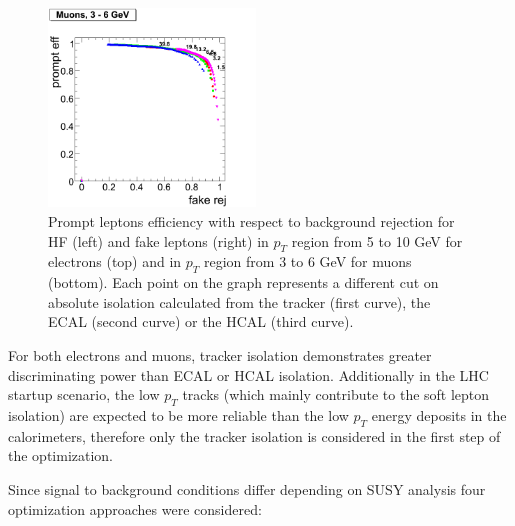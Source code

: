 \documentclass{cmspaper}
\begin{document}
\begin{figure}[htbp]
\begin{center}
   \includegraphics[width = 0.49\textwidth]{pictures/bkgdRej_sigEff/muon_fake_ptCut0_ptCut1.png}
   \caption{\small{Prompt leptons efficiency  with respect to background rejection for HF (left) and  fake
      leptons (right) in $p_T$ region from 5 to 10 GeV for electrons (top) and
       in $p_T$ region from 3 to 6 GeV for muons (bottom).
      Each point on the graph represents a different cut on absolute
      isolation calculated from the tracker (first curve), the ECAL (second curve) or the HCAL
      (third curve). }
   \label{fig:Elec_PtCut0_PtCut1}}
\end{center}
\end{figure}

For both electrons and muons, tracker isolation demonstrates
greater discriminating power than ECAL or HCAL isolation.
Additionally in the LHC startup scenario,
the low $p_T$ tracks (which mainly contribute to the soft lepton isolation)
are expected to be more reliable
than the low $p_T$ energy deposits in the calorimeters, therefore
only the tracker isolation is considered in the first step of the
optimization.

Since signal to background conditions differ depending on SUSY analysis four optimization
approaches were considered:
\end{document}

